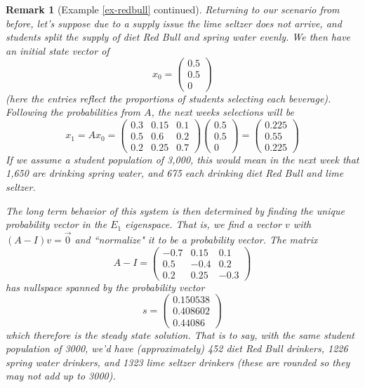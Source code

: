 \documentclass[12pt]{article}
\numberwithin{equation}{subsection}
\numberwithin{figure}{subsection}
\theoremstyle{note}
\newtheorem{remark}[subsection]{Remark}
\begin{document}
\begin{remark}[Example \ref{ex-redbull} continued] Returning to our scenario from before, let's suppose due to a supply issue the lime seltzer does not arrive, and students split the supply of diet Red Bull and spring water evenly.  We then have an initial state vector of \[x_0=\begin{pmatrix} 0.5 \\ 0.5 \\ 0 \end{pmatrix}\] (here the entries reflect the proportions of students selecting each beverage). Following the probabilities from $A$, the next weeks selections will be \[ x_1 =Ax_0=\begin{pmatrix} 0.3 &0.15  & 0.1 \\ 0.5 & 0.6 & 0.2 \\ 0.2 & 0.25 & 0.7\end{pmatrix} \begin{pmatrix} 0.5 \\ 0.5 \\ 0 \end{pmatrix}=\begin{pmatrix} 0.225 \\ 0.55 \\ 0.225\end{pmatrix} \] If we assume a student population of 3,000, this would mean in the next week that 1,650 are drinking spring water, and 675 each drinking diet Red Bull and lime seltzer. 
 
 The long term behavior of this system is then determined by finding the unique probability vector in the $E_1$ eigenspace. That is, we find a vector $v$ with $(A-I)v=\vec{0}$ and ``normalize" it to be a probability vector. The matrix \[ A-I=\begin{pmatrix} -0.7 &0.15  & 0.1 \\ 0.5 & -0.4& 0.2 \\ 0.2 & 0.25 & -0.3\end{pmatrix} \] has nullspace spanned by the probability vector  \[s= \begin{pmatrix} 0.150538 \\ 0.408602 \\ 0.44086 \end{pmatrix}\] which therefore is the steady state solution. That is to say, with the same student population of 3000, we'd have (approximately) 452 diet Red Bull drinkers, 1226 spring water drinkers, and 1323 lime seltzer drinkers (these are rounded so they may not add up to 3000).
\end{remark}
\end{document}
